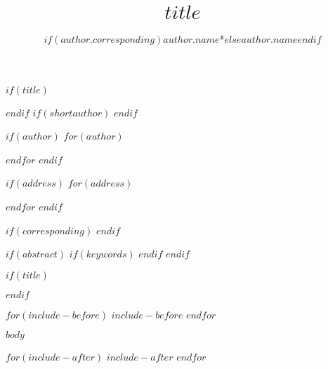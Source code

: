 \documentclass[AMS,STIX1COL]{WileyNJD-v2}
\begin{document}
$if(title)$
\title{$title$}
$endif$  
$if(shortauthor)$
$endif$ 

$if(author)$
$for(author)$
\author[$author.numaddress$]{$if(author.corresponding)$$author.name$*$else$$author.name$$endif$}
$endfor$
$endif$

$if(address)$
$for(address)$
\address[$address.numaddress$]{
, , }
$endfor$
$endif$

$if(corresponding)$
$endif$

$if(abstract)$
$if(keywords)$ 
$endif$
$endif$


$if(title)$
\maketitle
$endif$

$for(include-before)$
$include-before$
$endfor$

$body$

$for(include-after)$
$include-after$
$endfor$

%
\end{document}

